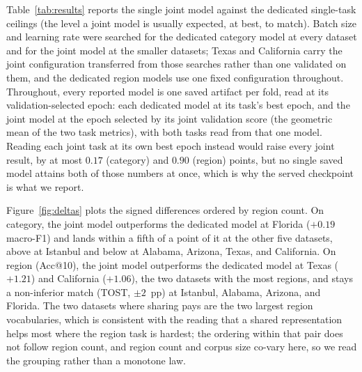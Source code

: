 Table~\ref{tab:results} reports the single joint model against the dedicated
single-task ceilings (the level a joint model is usually expected, at
best, to match). Batch size and learning rate were searched for the dedicated category model at every dataset and
for the joint model at the smaller datasets; Texas and California carry the joint configuration
transferred from those searches rather than one validated on them, and the dedicated region models
use one fixed configuration throughout.
Throughout, every reported model is one saved artifact per fold, read at its
validation-selected epoch: each dedicated model at its task's best epoch, and
the joint model at the epoch selected by its joint validation score (the
geometric mean of the two task metrics), with both tasks read from that one
model. Reading each joint task at its own best epoch instead would raise every joint result, by at most
$0.17$ (category) and $0.90$ (region) points, but no single saved model attains both of those
numbers at once, which is why the served checkpoint is what we report.

Figure~\ref{fig:deltas} plots the signed differences ordered by region count. On
category, the joint model outperforms the dedicated model at Florida
($+0.19$ macro-F1) and lands within a fifth of a point of it at the other five datasets, above at
Istanbul and below at Alabama, Arizona, Texas, and California.
On region (Acc@10), the joint model outperforms the dedicated model at Texas
($+1.21$) and California ($+1.06$), the two datasets with the most regions, and stays a
non-inferior match (TOST, $\pm2$~pp) at Istanbul, Alabama, Arizona, and Florida. The two datasets
where sharing pays are the two largest region vocabularies, which is consistent with the reading
that a shared representation helps most where the region task is hardest; the ordering within that
pair does not follow region count, and region count and corpus size co-vary here, so we read the
grouping rather than a monotone law.

